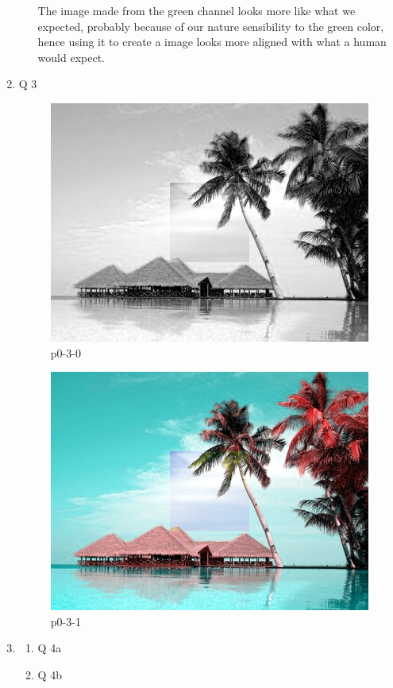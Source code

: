 \begin{enumerate}
\begin{enumerate}
The image made from the green channel looks more like what we expected, probably because of our nature sensibility to the green color, hence using it to create a image looks more aligned with what a human would expect.
\end{enumerate}

\item Q 3

\begin{figure}[ht]
\centering
\includegraphics{output/p0-3-0}
\caption{p0-3-0}
\label{fig:p0-3-0}
\end{figure}

\begin{figure}[ht]
\centering
\includegraphics{output/p0-3-1}
\caption{p0-3-1}
\label{fig:p0-3-1}
\end{figure}

\item
\begin{enumerate}
\item Q 4a

\item Q 4b


\end{enumerate}
\end{enumerate}
